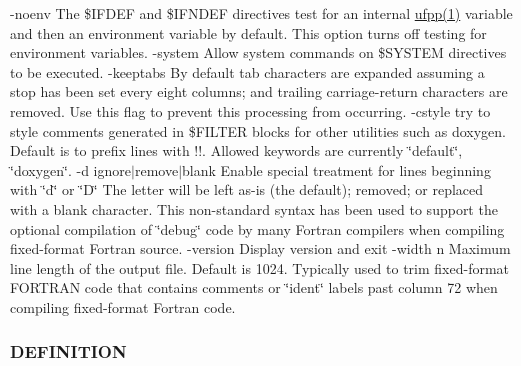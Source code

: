 -\/noenv The \$\+I\+F\+D\+EF and \$\+I\+F\+N\+D\+EF directives test for an internal \hyperlink{ufpp__overview_81_8txt_a97c20a96bcab81bc74c9d64b001f1202}{ufpp(1)} variable and then an environment variable by default. This option turns off testing for environment variables. -\/system Allow system commands on \$\+S\+Y\+S\+T\+EM directives to be executed. -\/keeptabs By default tab characters are expanded assuming a stop has been set every eight columns; and trailing carriage-\/return characters are removed. Use this flag to prevent this processing from occurring. -\/cstyle try to style comments generated in \$\+F\+I\+L\+T\+ER blocks for other utilities such as doxygen. Default is to prefix lines with \textquotesingle{}!!\textquotesingle{}. Allowed keywords are currently \char`\"{}default\char`\"{}, \char`\"{}doxygen\char`\"{}. -\/d ignore$\vert$remove$\vert$blank Enable special treatment for lines beginning with \char`\"{}d\char`\"{} or \char`\"{}\+D\char`\"{} The letter will be left as-\/is (the default); removed; or replaced with a blank character. This non-\/standard syntax has been used to support the optional compilation of \char`\"{}debug\char`\"{} code by many Fortran compilers when compiling fixed-\/format Fortran source. -\/version Display version and exit -\/width n Maximum line length of the output file. Default is 1024. Typically used to trim fixed-\/format F\+O\+R\+T\+R\+AN code that contains comments or \char`\"{}ident\char`\"{} labels past column 72 when compiling fixed-\/format Fortran code. \subsubsection*{D\+E\+F\+I\+N\+I\+T\+I\+ON}

